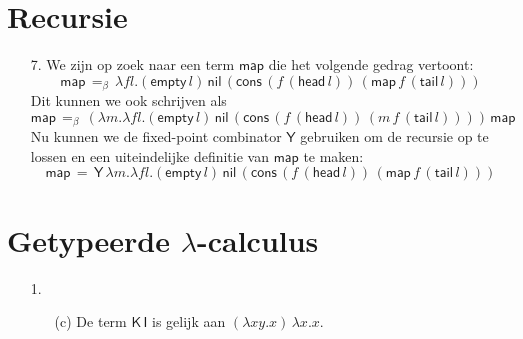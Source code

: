 \documentclass[a4paper,11pt]{article}
\begin{document}
\section{Recursie}


\begin{enumerate}


\item[7.]
We zijn op zoek naar een term $\textsf{map}$ die het volgende gedrag vertoont:
\begin{equation*}
\textsf{map} \, =_{\beta} \, \lambda f l. (\textsf{empty} \, l) \, \textsf{nil} \,
(\textsf{cons} \, (f \, (\textsf{head} \, l)) \, (\textsf{map} \, f \, (\textsf{tail} \, l)))
\end{equation*}
Dit kunnen we ook schrijven als
\begin{equation*}
\textsf{map} \, =_{\beta} \, (\lambda m. \lambda f l. (\textsf{empty} \, l) \, \textsf{nil} \,
(\textsf{cons} \, (f \, (\textsf{head} \, l)) \, (m \, f \, (\textsf{tail} \, l)))) \, \textsf{map}
\end{equation*}
Nu kunnen we de fixed-point combinator $\textsf{Y}$ gebruiken om de recursie op te lossen
en een uiteindelijke definitie van $\textsf{map}$ te maken:
\begin{equation*}
\textsf{map} \, = \, \textsf{Y} \, \lambda m. \lambda f l. (\textsf{empty} \, l) \, \textsf{nil} \,
(\textsf{cons} \, (f \, (\textsf{head} \, l)) \, (\textsf{map} \, f \, (\textsf{tail} \, l)))
\end{equation*}


\end{enumerate}


\section{Getypeerde $\lambda$-calculus}


\begin{enumerate}


\item[1.]

\begin{enumerate}

\item[(c)]
De term $\textsf{K} \, \textsf{I}$ is gelijk aan $(\lambda x y. x) \, \lambda x. x$.
\begin{prooftree}
\end{prooftree}

\end{enumerate}


\end{enumerate}
\end{document}
